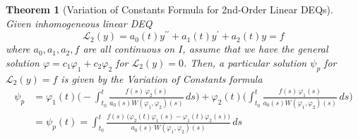 \documentclass{article}
\newtheorem{theorem}{Theorem}[section]
\theoremstyle{remark}
\theoremstyle{definition}
\begin{document}
\begin{theorem}[Variation of Constants Formula for 2nd-Order Linear DEQs]
Given inhomogeneous linear DEQ
\[\mathcal{L}_2(y) = a_0 (t) y^{\prime \prime} + a_1 (t) y^\prime + a_2 (t) y = f\]
where $a_0, a_1, a_2, f$ are all continuous on $I$, assume that we have the general solution $\varphi = c_1 \varphi_1 + c_2 \varphi_2$ for $\mathcal{L}_2(y) = 0$. Then, a particular solution $\psi_p$ for $\mathcal{L}_2 (y) = f$ is given by the \textit{Variation of Constants formula} 
\begin{align*}
    \psi_p & = \varphi_1 (t) \Bigg( - \int_{t_0}^t \frac{f(s)\,\varphi_2 (s)}{ a_0 (s) W(\varphi_1, \varphi_2) (s)}\,ds \Bigg) + \varphi_2 (t) \Bigg( \int_{t_0}^t \frac{f(s)\,\varphi_1 (s)}{ a_0 (s) W(\varphi_1, \varphi_2) (s)}\,ds \Bigg) \\
    & = \psi_p (t) = \int_{t_0}^t \frac{f(s) \, \big( \varphi_2 (t) \varphi_1 (s) - \varphi_1(t) \varphi_2 (s)\big)}{a_0 (s) \, W(\varphi_1, \varphi_2) (s)}\,ds
\end{align*}
\end{theorem}
\end{document}
